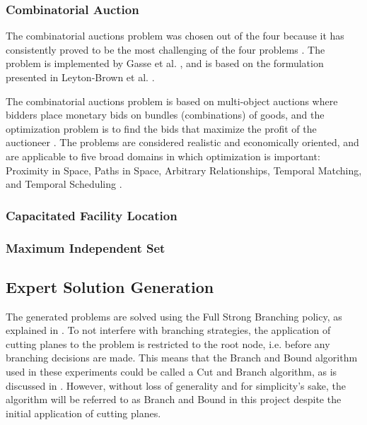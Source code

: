 \subsubsection{Combinatorial Auction}

The combinatorial auctions problem was chosen out of the four because it has consistently proved to be the most challenging of the four problems \cite{gasse2019exact} \cite{gupta2020hybrid}. The problem is implemented by Gasse et al. \cite{gasse2019exact}, and is based on the formulation presented in Leyton-Brown et al. \cite{brown2000towards}.  

The combinatorial auctions problem is based on multi-object auctions where bidders place monetary bids on bundles (combinations) of goods, and the optimization problem is to find the bids that maximize the profit of the auctioneer \cite{brown2000towards}. The problems are considered realistic and economically oriented, and are applicable to five broad domains in which optimization is important: Proximity in Space, Paths in Space, Arbitrary Relationships, Temporal Matching, and Temporal Scheduling \cite{brown2000towards}.  


\subsubsection{Capacitated Facility Location}


\subsubsection{Maximum Independent Set}





\subsection{Expert Solution Generation}\label{ssec:expertsolutiongeneration}

The generated problems are solved using the Full Strong Branching policy, as explained in . To not interfere with branching strategies, the application of cutting planes to the problem is restricted to the root node, i.e. before any branching decisions are made. This means that the Branch and Bound algorithm used in these experiments could be called a Cut and Branch algorithm, as is discussed in .
However, without loss of generality and for simplicity's sake, the algorithm will be referred to as Branch and Bound in this project despite the initial application of cutting planes.  

